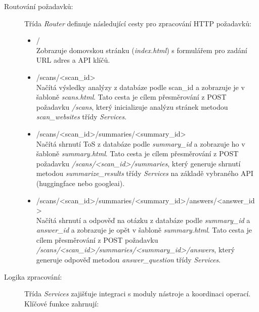 \begin{description}
    \item[Routování požadavků:] Třída \textit{Router} definuje následující cesty pro zpracování HTTP požadavků:
    \begin{itemize}
        \item / \\
        Zobrazuje domovskou stránku (\textit{index.html}) s formulářem pro zadání URL adres a API klíčů.
    
        \item /scans/<scan_id> \\
        Načítá výsledky analýzy z databáze podle scan_id a zobrazuje je v šabloně \textit{scans.html}.
        Tato cesta je cílem přesměrování z POST požadavku \textit{/scans}, který inicializuje analýzu stránek metodou \textit{scan_websites} třídy \textit{Services}.
    
        \item /scans/<scan_id>/summaries/<summary_id> \\
        Načítá shrnutí ToS z databáze podle \textit{summary_id} a zobrazuje ho v šabloně \textit{summary.html}.
        Tato cesta je cílem přesměrování z POST požadavku \textit{/scans/<scan_id>/summaries}, který generuje shrnutí metodou \textit{summarize_results} třídy \textit{Services} na základě vybraného API (huggingface nebo googleai).
    
        \item /scans/<scan_id>/summaries/<summary_id>/answers/<answer_id> \\
        Načítá shrnutí a odpověď na otázku z databáze podle \textit{summary_id} a \textit{answer_id} a zobrazuje je opět v šabloně \textit{summary.html}.
        Tato cesta je cílem přesměrování z POST požadavku \textit{/scans/<scan_id>/summaries/\allowbreak<summary_id>/answers}, který generuje odpověď metodou \textit{answer_question} třídy \textit{Services}.
    \end{itemize}
    
    \item[Logika zpracování:] 
      Třída \textit{Services} zajišťuje integraci s moduly nástroje a koordinaci operací. 
      Klíčové funkce zahrnují:


\end{description}
